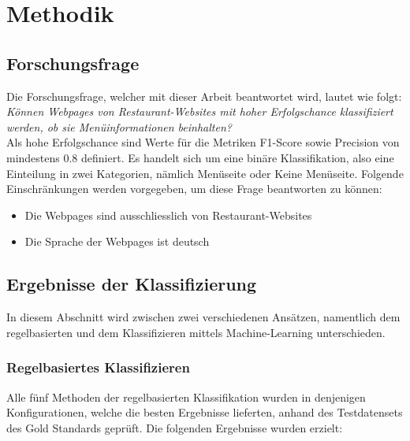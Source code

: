 \chapter{Methodik}
\label{chap:methodik}
\section{Forschungsfrage}
Die Forschungsfrage, welcher mit dieser Arbeit beantwortet wird, lautet wie folgt:\\

\emph{Können Webpages von Restaurant-Websites mit hoher Erfolgschance klassifiziert werden, ob sie Menüinformationen beinhalten?}\\

Als hohe Erfolgschance sind Werte für die Metriken \glqq F1-Score\grqq{} sowie \glqq Precision\grqq{} von mindestens 0.8 definiert.
Es handelt sich um eine binäre Klassifikation, also eine Einteilung in zwei Kategorien, nämlich \glqq Menüseite\grqq{} oder \glqq Keine Menüseite\grqq.
Folgende Einschränkungen werden vorgegeben, um diese Frage beantworten zu können:
\begin{itemize}
	\item Die Webpages sind ausschliesslich von Restaurant-Websites
	\item Die Sprache der Webpages ist deutsch
\end{itemize}
\section{Ergebnisse der Klassifizierung}
In diesem Abschnitt wird zwischen zwei verschiedenen Ansätzen, namentlich dem regelbasierten und dem Klassifizieren mittels Machine-Learning unterschieden.
\subsection{Regelbasiertes Klassifizieren}
Alle fünf Methoden der regelbasierten Klassifikation wurden in denjenigen Konfigurationen, welche die besten Ergebnisse lieferten, anhand des Testdatensets des Gold Standards geprüft.
Die folgenden Ergebnisse wurden erzielt:\\

